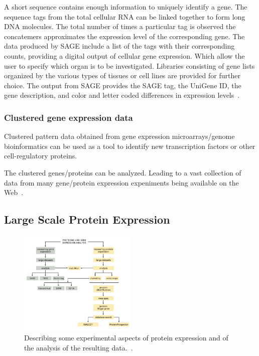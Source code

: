 \documentclass{report}
\begin{document}
A short sequence contains enough information to uniquely identify a gene. The sequence tags from the total cellular RNA can be linked together to form long DNA molecules. The total number of times a particular tag is observed the concatemers approximates the expression level of the corresponding gene. The data produced by SAGE include a list of the tags with their corresponding counts, providing a digital output of cellular gene expression.  Which allow the user to specify which organ is to be investigated. Libraries consisting of gene lists organized by the various types of tissues or cell lines are provided for further choice. The output from SAGE provides the SAGE tag, the UniGene ID, the gene description, and color and letter coded differences in expression levels~\cite{zvelebil_understanding_2008}.

\subsubsection{Clustered gene expression data}

Clustered pattern data obtained from gene expression microarrays/genome bioinformatics can be used as a tool to identify new transcription factors or other cell-regulatory proteins. 

The clustered genes/proteins can be analyzed. Leading to a vast collection of data from many gene/protein expression expeniments being available on the Web~\cite{zvelebil_understanding_2008}.

\subsection{Large Scale Protein Expression}

\begin{figure}[H]
    \centering
    \includegraphics[width=0.5\textwidth]{Overlaping.png}
    \caption{\label{fig:Overlaping}Describing some experimental aspects of protein expression and of the analysis of the resulting data.~\cite{zvelebil_understanding_2008}.}
\end{figure}
\end{document}
